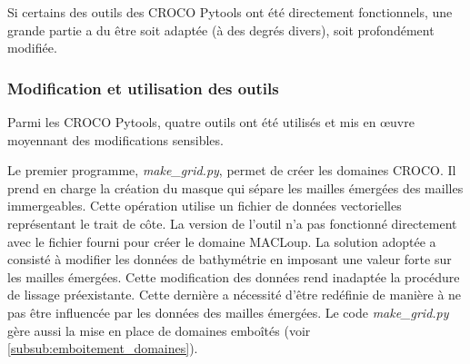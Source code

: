 \documentclass[10pt,a4paper,titlepage]{article}
\begin{document}
Si certains des outils des CROCO Pytools ont été directement fonctionnels, une grande partie a du être soit adaptée (à des degrés divers), soit profondément modifiée.

\subsubsection{Modification et utilisation des outils}
\label{subsub:modif_ytilisation_pytools}

Parmi les CROCO Pytools, quatre outils ont été utilisés et mis en \oe{uvre} moyennant des modifications sensibles.

Le premier programme, \textit{make\_grid.py}, permet de créer les domaines CROCO.
Il prend en charge la création du masque qui sépare les mailles émergées des mailles immergeables.
Cette opération utilise un fichier de données vectorielles représentant le trait de côte.
La version de l'outil n'a pas fonctionné directement avec le fichier fourni pour créer le domaine MACLoup.
La solution adoptée a consisté à modifier les données de bathymétrie en imposant une valeur forte sur les mailles émergées.
Cette modification des données rend inadaptée la procédure de lissage préexistante.
Cette dernière a nécessité d'être redéfinie de manière à ne pas être influencée par les données des mailles émergées.
Le code \textit{make\_grid.py} gère aussi la mise en place de domaines emboîtés (voir \ref{subsub:emboitement_domaines}).%
\end{document}
